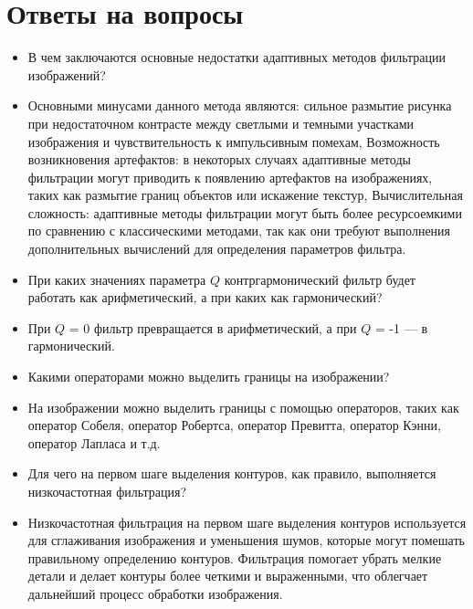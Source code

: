 \section{Ответы на вопросы}

\setcounter{question}{0}

\newcommand{\question}[1]{\item[Q\refstepcounter{question}\thequestion.] #1}
\newcommand{\answer}[1]{\item[A\thequestion.] #1}

\begin{itemize}

\question{В чем заключаются основные недостатки адаптивных методов фильтрации изображений?}
\answer{Основными минусами данного метода являются: сильное размытие рисунка при недостаточном контрасте между светлыми и темными участками изображения и чувствительность к импульсивным помехам, Возможность возникновения артефактов: в некоторых случаях адаптивные методы фильтрации могут приводить к появлению артефактов на изображениях, таких как размытие границ объектов или искажение текстур, Вычислительная сложность: адаптивные методы фильтрации могут быть более ресурсоемкими по сравнению с классическими методами, так как они требуют выполнения дополнительных вычислений для определения параметров фильтра.}

\question{При каких значениях параметра $Q$ контргармонический
фильтр будет работать как арифметический, а при каких как гармонический?}
\answer{При $Q$ = 0 фильтр превращается в арифметический, а при $Q$ = -1 — в гармонический.}

\question{Какими операторами можно выделить границы на изображении?}
\answer{На изображении можно выделить границы с помощью операторов, таких как оператор Собеля, оператор Робертса, оператор Превитта, оператор Кэнни, оператор Лапласа и т.д.}

\question{Для чего на первом шаге выделения контуров, как правило,
выполняется низкочастотная фильтрация?}
\answer{Низкочастотная фильтрация на первом шаге выделения контуров используется для сглаживания изображения и уменьшения шумов, которые могут помешать правильному определению контуров. Фильтрация помогает убрать мелкие детали и делает контуры более четкими и выраженными, что облегчает дальнейший процесс обработки изображения.}

\end{itemize}

